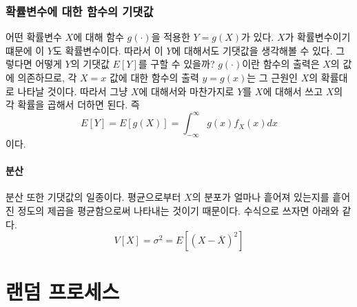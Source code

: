 \subsubsection{확률변수에 대한 함수의 기댓값}
어떤 확률변수 $X$에 대해 함수 $g(\cdot)$을 적용한 $Y=g(X)$가 있다. $X$가 확률변수이기 떄문에 이 $Y$도 확률변수이다.
따라서 이 $Y$에 대해서도 기댓값을 생각해볼 수 있다. 그렇다면 어떻게 $Y$의 기댓값 $E[Y]$를 구할 수 있을까?
$g(\cdot)$이란 함수의 출력은 $X$의 값에 의존하므로, 각 $X=x$ 값에 대한 함수의 출력 $y=g(x)$는 그 근원인 $X$의 확률대로 나타날 것이다.
따라서 그냥 $X$에 대해서와 마찬가지로 $Y$를 $X$에 대해서 쓰고 $X$의 각 확률을 곱해서 더하면 된다. 즉
\begin{equation}
    E[Y]=E[g(X)]=\int_{-\infty}^{\infty}g(x)f_X(x)dx
\end{equation}
이다.
\paragraph{분산}
분산 또한 기댓값의 일종이다. 평균으로부터 $X$의 분포가 얼마나 흩어져 있는지를 흩어진 정도의 제곱을 평균함으로써 나타내는 것이기 때문이다.
수식으로 쓰자면 아래와 같다.
\begin{equation}
    V[X]=\sigma^2=E[(X-\overline{X})^2]
\end{equation}


\section{랜덤 프로세스}